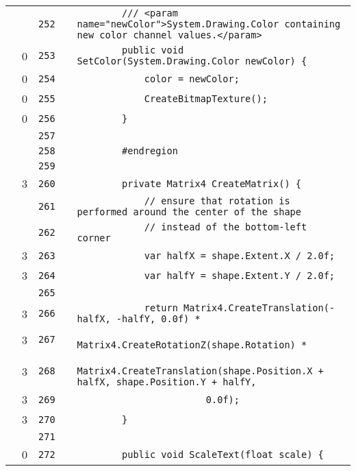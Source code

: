 \documentclass[a4paper,landscape,10pt]{article}
\begin{document}
\begin{longtable}[l]{lrrll}
\cellcolor{gray} &  & \verb~252~ & & \verb~        /// <param name="newColor">System.Drawing.Color containing new color channel values.</param>~\\
\cellcolor{red} & 0 & \verb~253~ & & \verb~        public void SetColor(System.Drawing.Color newColor) {~\\
\cellcolor{red} & 0 & \verb~254~ & & \verb~            color = newColor;~\\
\cellcolor{red} & 0 & \verb~255~ & & \verb~            CreateBitmapTexture();~\\
\cellcolor{red} & 0 & \verb~256~ & & \verb~        }~\\
\cellcolor{gray} &  & \verb~257~ & & \verb~~\\
\cellcolor{gray} &  & \verb~258~ & & \verb~        #endregion~\\
\cellcolor{gray} &  & \verb~259~ & & \verb~~\\
\cellcolor{green} & 3 & \verb~260~ & & \verb~        private Matrix4 CreateMatrix() {~\\
\cellcolor{gray} &  & \verb~261~ & & \verb~            // ensure that rotation is performed around the center of the shape~\\
\cellcolor{gray} &  & \verb~262~ & & \verb~            // instead of the bottom-left corner~\\
\cellcolor{green} & 3 & \verb~263~ & & \verb~            var halfX = shape.Extent.X / 2.0f;~\\
\cellcolor{green} & 3 & \verb~264~ & & \verb~            var halfY = shape.Extent.Y / 2.0f;~\\
\cellcolor{gray} &  & \verb~265~ & & \verb~~\\
\cellcolor{green} & 3 & \verb~266~ & & \verb~            return Matrix4.CreateTranslation(-halfX, -halfY, 0.0f) *~\\
\cellcolor{green} & 3 & \verb~267~ & & \verb~                   Matrix4.CreateRotationZ(shape.Rotation) *~\\
\cellcolor{green} & 3 & \verb~268~ & & \verb~                   Matrix4.CreateTranslation(shape.Position.X + halfX, shape.Position.Y + halfY,~\\
\cellcolor{green} & 3 & \verb~269~ & & \verb~                       0.0f);~\\
\cellcolor{green} & 3 & \verb~270~ & & \verb~        }~\\
\cellcolor{gray} &  & \verb~271~ & & \verb~~\\
\cellcolor{red} & 0 & \verb~272~ & & \verb~        public void ScaleText(float scale) {~\\

\end{longtable}
\end{document}
